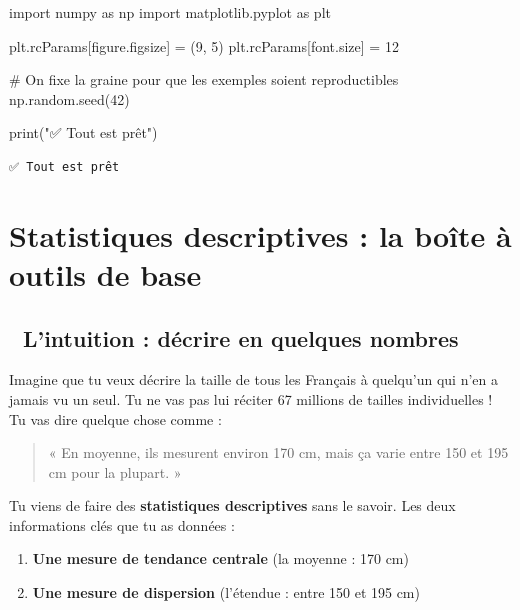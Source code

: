 \documentclass[
  french,
  11pt,
  a4paper,
]{scrbook}
\newenvironment{Shaded}{}{}
\newcommand{\BuiltInTok}[1]{\textcolor[rgb]{0.84,0.23,0.29}{#1}}
\newcommand{\CommentTok}[1]{\textcolor[rgb]{0.42,0.45,0.49}{#1}}
\newcommand{\DecValTok}[1]{\textcolor[rgb]{0.00,0.36,0.77}{#1}}
\newcommand{\ImportTok}[1]{\textcolor[rgb]{0.01,0.18,0.38}{#1}}
\newcommand{\NormalTok}[1]{\textcolor[rgb]{0.14,0.16,0.18}{#1}}
\newcommand{\OperatorTok}[1]{\textcolor[rgb]{0.14,0.16,0.18}{#1}}
\newcommand{\StringTok}[1]{\textcolor[rgb]{0.01,0.18,0.38}{#1}}
\providecommand{\tightlist}{%
  \setlength{\itemsep}{0pt}\setlength{\parskip}{0pt}}
\begin{document}
\protect{}\label{setup}
\begin{Shaded}
\begin{Highlighting}[]
\ImportTok{import}\NormalTok{ numpy }\ImportTok{as}\NormalTok{ np}
\ImportTok{import}\NormalTok{ matplotlib.pyplot }\ImportTok{as}\NormalTok{ plt}

\NormalTok{plt.rcParams[}\StringTok{\textquotesingle{}figure.figsize\textquotesingle{}}\NormalTok{] }\OperatorTok{=}\NormalTok{ (}\DecValTok{9}\NormalTok{, }\DecValTok{5}\NormalTok{)}
\NormalTok{plt.rcParams[}\StringTok{\textquotesingle{}font.size\textquotesingle{}}\NormalTok{] }\OperatorTok{=} \DecValTok{12}

\CommentTok{\# On fixe la graine pour que les exemples soient reproductibles}
\NormalTok{np.random.seed(}\DecValTok{42}\NormalTok{)}

\BuiltInTok{print}\NormalTok{(}\StringTok{"✅ Tout est prêt"}\NormalTok{)}
\end{Highlighting}
\end{Shaded}

\begin{verbatim}
✅ Tout est prêt
\end{verbatim}

\chapter{Statistiques descriptives : la boîte à outils de
base}\label{statistiques-descriptives-la-bouxeete-uxe0-outils-de-base}

\section{🎨 L'intuition : décrire en quelques
nombres}\label{lintuition-duxe9crire-en-quelques-nombres}

Imagine que tu veux décrire la taille de tous les Français à quelqu'un
qui n'en a jamais vu un seul. Tu ne vas pas lui réciter 67 millions de
tailles individuelles ! Tu vas dire quelque chose comme :

\begin{quote}
« En moyenne, ils mesurent environ 170 cm, mais ça varie entre 150 et
195 cm pour la plupart. »
\end{quote}

Tu viens de faire des \textbf{statistiques descriptives} sans le savoir.
Les deux informations clés que tu as données :

\begin{enumerate}
\def\labelenumi{\arabic{enumi}.}
\tightlist
\item
  \textbf{Une mesure de tendance centrale} (la moyenne : 170 cm)
\item
  \textbf{Une mesure de dispersion} (l'étendue : entre 150 et 195 cm)
\end{enumerate}
\end{document}
